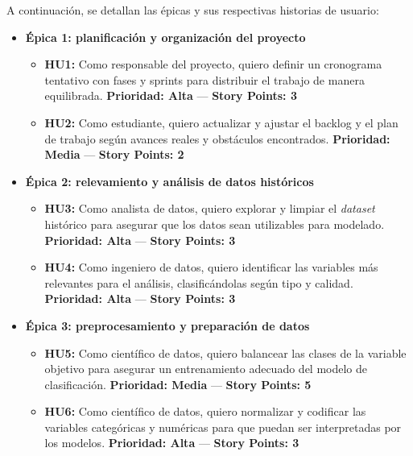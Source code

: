 \documentclass[
11pt, %
]{charter}
\begin{document}
A continuación, se detallan las épicas y sus respectivas historias de usuario:

\begin{itemize}
  \item \textbf{Épica 1: planificación y organización del proyecto}
    \begin{itemize}
      \item \textbf{HU1:} Como responsable del proyecto, quiero definir un cronograma tentativo con fases y sprints para distribuir el trabajo de manera equilibrada.  
      \newline \textbf{Prioridad: Alta} — \textbf{Story Points: 3}

      \item \textbf{HU2:} Como estudiante, quiero actualizar y ajustar el backlog y el plan de trabajo según avances reales y obstáculos encontrados.  
      \newline \textbf{Prioridad: Media} — \textbf{Story Points: 2}
    \end{itemize}

  \item \textbf{Épica 2: relevamiento y análisis de datos históricos}
    \begin{itemize}
      \item \textbf{HU3:} Como analista de datos, quiero explorar y limpiar el \textit{dataset} histórico para asegurar que los datos sean utilizables para modelado.  
      \newline \textbf{Prioridad: Alta} — \textbf{Story Points: 3}
      
      \item \textbf{HU4:} Como ingeniero de datos, quiero identificar las variables más relevantes para el análisis, clasificándolas según tipo y calidad.  
      \newline \textbf{Prioridad: Alta} — \textbf{Story Points: 3}
    \end{itemize}

  \item \textbf{Épica 3: preprocesamiento y preparación de datos}
    \begin{itemize}
      \item \textbf{HU5:} Como científico de datos, quiero balancear las clases de la variable objetivo para asegurar un entrenamiento adecuado del modelo de clasificación.  
      \newline \textbf{Prioridad: Media} — \textbf{Story Points: 5}

      \item \textbf{HU6:} Como científico de datos, quiero normalizar y codificar las variables categóricas y numéricas para que puedan ser interpretadas por los modelos.  
      \newline \textbf{Prioridad: Alta} — \textbf{Story Points: 3}
    \end{itemize}


\end{itemize}
\end{document}
